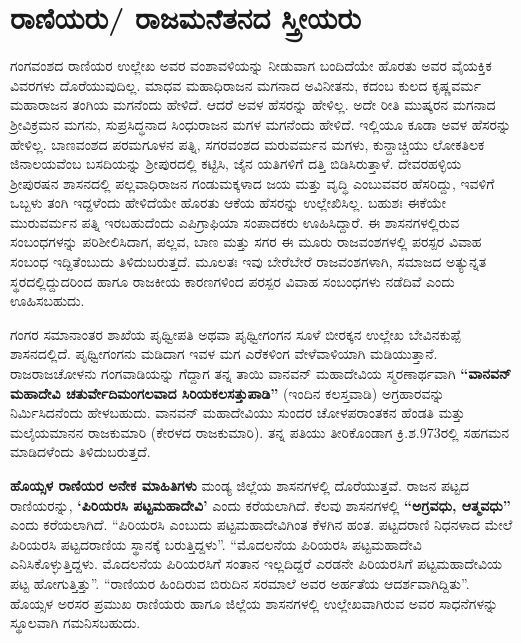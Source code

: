 \section*{ರಾಣಿಯರು/ ರಾಜಮನೆತನದ ಸ್ತ್ರೀಯರು}

ಗಂಗವಂಶದ ರಾಣಿಯರ ಉಲ್ಲೇಖ ಅವರ ವಂಶಾವಳಿಯನ್ನು ನೀಡುವಾಗ ಬಂದಿದೆಯೇ ಹೊರತು ಅವರ ವೈಯಕ್ತಿಕ ವಿವರಗಳು ದೊರೆಯುವುದಿಲ್ಲ. ಮಾಧವ ಮಹಾಧಿರಾಜನ ಮಗನಾದ ಅವಿನೀತನು, ಕದಂಬ ಕುಲದ ಕೃಷ್ಣವರ್ಮ ಮಹಾರಾಜನ ತಂಗಿಯ ಮಗನೆಂದು ಹೇಳಿದೆ. ಆದರೆ ಅವಳ ಹೆಸರನ್ನು ಹೇಳಿಲ್ಲ. ಅದೇ ರೀತಿ ಮುಷ್ಕರನ ಮಗನಾದ ಶ‍್ರೀವಿಕ್ರಮನ ಮಗನು, ಸುಪ್ರಸಿದ್ಧನಾದ ಸಿಂಧುರಾಜನ ಮಗಳ ಮಗನೆಂದು ಹೇಳಿದೆ. ಇಲ್ಲಿಯೂ ಕೂಡಾ ಅವಳ ಹೆಸರನ್ನು ಹೇಳಿಲ್ಲ. ಬಾಣವಂಶದ ಪರಮಗೂಳನ ಪತ್ನಿ, ಸಗರವಂಶದ ಮರುವರ್ಮನ ಮಗಳು, ಕುನ್ದಾಚ್ಚಿಯು ಲೋಕತಿಲಕ ಜಿನಾಲಯವೆಂಬ ಬಸದಿಯನ್ನು ಶ‍್ರೀಪುರದಲ್ಲಿ ಕಟ್ಟಿಸಿ, ಜೈನ ಯತಿಗಳಿಗೆ ದತ್ತಿ ಬಿಡಿಸಿರುತ್ತಾಳೆ. ದೇವರಹಳ್ಳಿಯ ಶ‍್ರೀಪುರಷನ ಶಾಸನದಲ್ಲಿ ಪಲ್ಲವಾಧಿರಾಜನ ಗಂಡುಮಕ್ಕಳಾದ ಜಯ ಮತ್ತು ವೃದ್ಧಿ ಎಂಬುವವರ ಹೆಸರಿದ್ದು, ಇವಳಿಗೆ ಒಬ್ಬಳು ತಂಗಿ ಇದ್ದಳೆಂದು ಹೇಳಿದೆಯೇ ಹೊರತು ಆಕೆಯ ಹೆಸರನ್ನು ಉಲ್ಲೇಖಿಸಿಲ್ಲ. ಬಹುಶಃ ಈಕೆಯೇ ಮುರುವರ್ಮನ ಪತ್ನಿ ಇರಬಹುದೆಂದು ಎಪಿಗ್ರಾಫಿಯಾ ಸಂಪಾದಕರು ಊಹಿಸಿದ್ದಾರೆ. ಈ ಶಾಸನಗಳಲ್ಲಿರುವ ಸಂಬಂಧಗಳನ್ನು ಪರಿಶೀಲಿಸಿದಾಗ, ಪಲ್ಲವ, ಬಾಣ ಮತ್ತು ಸಗರ ಈ ಮೂರು ರಾಜವಂಶಗಳಲ್ಲಿ ಪರಸ್ಪರ ವಿವಾಹ ಸಂಬಂಧ ಇದ್ದಿತೆಂಬುದು ತಿಳಿದುಬರುತ್ತದೆ. ಮೂಲತಃ ಇವು ಬೇರೆಬೇರೆ ರಾಜವಂಶಗಳಾಗಿ, ಸಮಾಜದ ಅತ್ಯುನ್ನತ ಸ್ಥರದಲ್ಲಿದ್ದುದರಿಂದ ಹಾಗೂ ರಾಜಕೀಯ ಕಾರಣಗಳಿಂದ ಪರಸ್ಪರ ವಿವಾಹ ಸಂಬಂಧಗಳು ನಡೆದಿವೆ ಎಂದು ಊಹಿಸಬಹುದು.

ಗಂಗರ ಸಮಾನಾಂತರ ಶಾಖೆಯ ಪೃಥ್ವೀಪತಿ ಅಥವಾ ಪೃಥ್ವೀಗಂಗನ ಸೂಳೆ ಬೀರಕ್ಕನ ಉಲ್ಲೇಖ ಬೇವಿನಕುಪ್ಪೆ ಶಾಸನದಲ್ಲಿದೆ. ಪೃಥ್ವೀಗಂಗನು ಮಡಿದಾಗ ಇವಳ ಮಗ ಎರೆಕಳಿಂಗ ವೇಳೆವಾಳಿಯಾಗಿ ಮಡಿಯುತ್ತಾನೆ. ರಾಜರಾಜಚೋಳನು ಗಂಗವಾಡಿಯನ್ನು ಗೆದ್ದಾಗ ತನ್ನ ತಾಯಿ ವಾನವನ್​ ಮಹಾದೇವಿಯ ಸ್ಮರಣಾರ್ಥವಾಗಿ \textbf{“ವಾನವನ್​ಮಹಾದೇವಿ\general{\break } ಚತುರ್ವೇದಿಮಂಗಲವಾದ ಸಿರಿಯಕಲಸತ್ತುಪಾಡಿ”} (ಇಂದಿನ ಕಲಸ್ತವಾಡಿ) ಅಗ್ರಹಾರವನ್ನು ನಿರ್ಮಿಸಿದನೆಂದು ಹೇಳ\-ಬಹುದು. ವಾನವನ್​ ಮಹಾದೇವಿಯು ಸುಂದರ ಚೋಳಪರಾಂತಕನ ಹೆಂಡತಿ ಮತ್ತು ಮಲೈಯಮಾನನ ರಾಜಕುಮಾರಿ (ಕೇರಳದ ರಾಜಕುಮಾರಿ). ತನ್ನ ಪತಿಯು ತೀರಿಕೊಂಡಾಗ ಕ್ರಿ.ಶ.973ರಲ್ಲಿ ಸಹಗಮನ ಮಾಡಿದಳೆಂದು ತಿಳಿದುಬರುತ್ತದೆ.

\newpage

\textbf{ಹೊಯ್ಸಳ ರಾಣಿಯರ ಅನೇಕ ಮಾಹಿತಿಗಳು} ಮಂಡ್ಯ ಜಿಲ್ಲೆಯ ಶಾಸನಗಳಲ್ಲಿ ದೊರೆಯುತ್ತವೆ. ರಾಜನ ಪಟ್ಟದ ರಾಣಿಯರನ್ನು, \textbf{‘ಪಿರಿಯರಸಿ ಪಟ್ಟಮಹಾದೇವಿ’} ಎಂದು ಕರೆಯಲಾಗಿದೆ. ಕೆಲವು ಶಾಸನಗಳಲ್ಲಿ \textbf{“ಅಗ್ರವಧು, ಆತ್ಮವಧು”} ಎಂದು ಕರೆಯಲಾಗಿದೆ. “ಪಿರಿಯರಸಿ ಎಂಬುದು ಪಟ್ಟಮಹಾದೇವಿಗಿಂತ ಕೆಳಗಿನ ಹಂತ. ಪಟ್ಟದರಾಣಿ ನಿಧನಳಾದ ಮೇಲೆ ಪಿರಿಯರಸಿ ಪಟ್ಟದರಾಣಿಯ ಸ್ಥಾನಕ್ಕೆ ಬರುತ್ತಿದ್ದಳು”. “ಮೊದಲನೆಯ ಪಿರಿಯರಸಿ ಪಟ್ಟಮಹಾದೇವಿ ಎನಿಸಿಕೊಳ್ಳುತ್ತಿದ್ದಳು. ಮೊದಲನೆಯ ಪಿರಿಯರಸಿಗೆ ಸಂತಾನ ಇಲ್ಲದಿದ್ದರೆ ಎರಡನೇ ಪಿರಿಯರಸಿಗೆ ಪಟ್ಟಮಹಾದೇವಿಯ ಪಟ್ಟ ಹೋಗುತ್ತಿತ್ತು”. “ರಾಣಿಯರ ಹಿಂದಿರುವ ಬಿರುದಿನ ಸರಮಾಲೆ ಅವರ ಅರ್ಹತೆಯ ಆದರ್ಶವಾಗಿದ್ದಿತು”. ಹೊಯ್ಸಳ ಅರಸರ ಪ್ರಮುಖ ರಾಣಿಯರು ಹಾಗೂ ಜಿಲ್ಲೆಯ ಶಾಸನಗಳಲ್ಲಿ ಉಲ್ಲೇಖವಾಗಿರುವ ಅವರ ಸಾಧನೆಗಳನ್ನು ಸ್ಥೂಲವಾಗಿ ಗಮನಿಸಬಹುದು.

